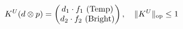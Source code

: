 \documentclass[preview]{standalone}
\begin{document}
\begin{align*}
\special{dvisvgm:raw <g id='unique000'>}K^U(d\otimes p) = \begin{pmatrix} d_1\cdot f_1\text{ (Temp)} \\ d_2\cdot f_2\text{ (Bright)} \end{pmatrix}, \quad \|K^U\|_{\text{op}}\le 1\special{dvisvgm:raw </g>}
\end{align*}
\end{document}
